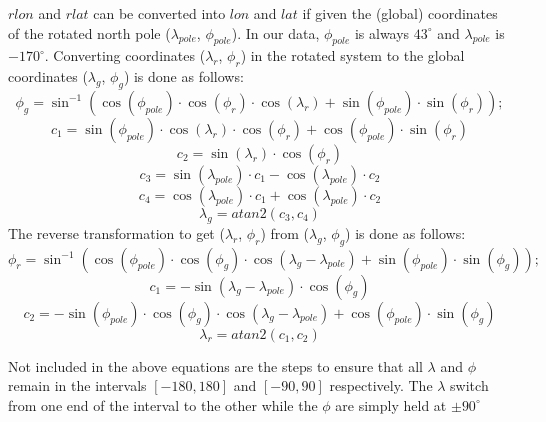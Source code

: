 $rlon$ and $rlat$ can be converted into $lon$ and $lat$ if given the (global) coordinates of the rotated north pole ($\lambda_{pole}$, $\phi_{pole}$). In our data, $\phi_{pole}$ is always $43^{\circ}$ and $\lambda_{pole}$ is $-170^{\circ}$. Converting coordinates ($\lambda_r$, $\phi_r$) in the rotated system to the global coordinates ($\lambda_g$, $\phi_g$) is done as follows: 
\begin{equation}
		\phi_g = \sin^{-1} ( \cos (\phi_{pole}) \cdot \cos (\phi_r) \cdot \cos (\lambda_r) + \sin (\phi_{pole}) \cdot \sin (\phi_r) );
\end{equation}
\begin{equation}
		c_1 = \sin (\phi_{pole}) \cdot \cos (\lambda_r) \cdot \cos (\phi_r) + \cos (\phi_{pole}) \cdot \sin (\phi_r)
\end{equation}
\begin{equation}
		c_2 = \sin (\lambda_r) \cdot \cos (\phi_r)
\end{equation}
\begin{equation}
		c_3 = \sin (\lambda_{pole}) \cdot c_1 - \cos (\lambda_{pole}) \cdot c_2
\end{equation}
\begin{equation}
		c_4 = \cos (\lambda_{pole}) \cdot c_1 + \cos (\lambda_{pole}) \cdot c_2
\end{equation}
\begin{equation}
		\lambda_g = atan2(c_3,c_4)
\end{equation}
The reverse transformation to get ($\lambda_r$, $\phi_r$) from ($\lambda_g$, $\phi_g$) is done as follows:
\begin{equation}
	\phi_r = \sin^{-1}( \cos(\phi_{pole}) \cdot \cos(\phi_g) \cdot \cos(\lambda_g - \lambda_{pole}) + \sin(\phi_{pole}) \cdot \sin(\phi_g) );
\end{equation}
\begin{equation}
	c_1 = -\sin(\lambda_g - \lambda_{pole}) \cdot \cos(\phi_g)
\end{equation}
\begin{equation}
	c_2 = -\sin(\phi_{pole}) \cdot \cos(\phi_g) \cdot \cos(\lambda_g - \lambda_{pole}) + \cos(\phi_{pole}) \cdot \sin(\phi_g)
\end{equation}
\begin{equation}
	\lambda_r  = atan2(c_1, c_2)
\end{equation}

Not included in the above equations are the steps to ensure that all $\lambda$ and $\phi$ remain in the intervals $[-180,180]$ and $[-90,90]$ respectively. The $\lambda$ switch from one end of the interval to the other while the $\phi$ are simply held at $\pm 90^{\circ}$%

